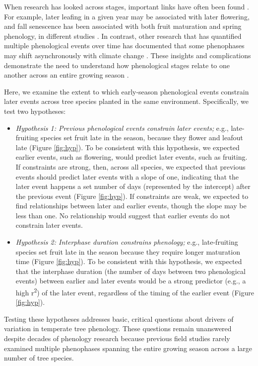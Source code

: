 \documentclass{article}
\begin{document}
\par When research has looked across stages, important links have often been found \citep{li2016}. For example, later leafing in a given year may be associated with later flowering, and fall senescence has been associated with both fruit maturation and spring phenology, in different studies \citep{lechowicz1995,keenan2015,liu2016}. In contrast, other research that has quantified multiple phenological events over time has documented that some phenophases may shift asynchronously with climate change \citep[e.g., spring events are occurring earlier as fall events have gotten later, first-flower dates have shifted earlier whereas last-flower dates have not,][]{menzel2006,caradonna2014}. These insights and complications demonstrate the need to understand how phenological stages relate to one another across an entire growing season \citep{wolkovich2014}.

\par Here, we examine the extent to which early-season phenological events constrain later events across tree species planted in the same environment. Specifically, we test two hypotheses:
\begin{itemize}
\item \textit{Hypothesis 1: Previous phenological events constrain later events;} e.g., late-fruiting species set fruit late in the season, because they flower and leafout late (Figure \ref{fig:hyp}). To be consistent with this hypothesis, we expected earlier events, such as flowering, would predict later events, such as fruiting. If constraints are strong, then, across all species, we expected that previous events should predict later events with a slope of one, indicating that the later event happens a set number of days (represented by the intercept) after the previous event (Figure \ref{fig:hyp}). If constraints are weak, we expected to find relationships between later and earlier events, though the slope may be less than one. No relationship would suggest that earlier events do not constrain later events.

\item \textit{Hypothesis 2: Interphase duration constrains phenology;} e.g., late-fruiting species set fruit late in the season because they require longer maturation time (Figure \ref{fig:hyp}). To be consistent with this hypothesis, we expected that the interphase duration (the number of days between two phenological events) between earlier and later events would be a strong predictor (e.g., a high r\textsuperscript{2}) of the later event, regardless of the timing of the earlier event (Figure \ref{fig:hyp}). 
\end{itemize}
Testing these hypotheses addresses basic, critical questions about drivers of variation in temperate tree phenology. These questions remain unanswered despite decades of phenology research because previous field studies rarely examined multiple phenophases spanning the entire growing season across a large number of tree species. 
\end{document}
